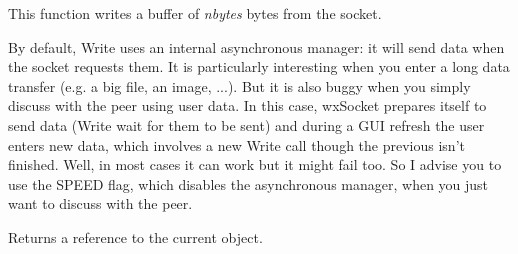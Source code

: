 \label{wxsocketbasesetflags}


\twocolwidtha{7cm}
\begin{twocollist}\itemsep=0pt
\end{twocollist}

%
%
\label{wxsocketbasewrite}


This function writes a buffer of {\it nbytes} bytes from the socket.


By default, Write uses an internal asynchronous manager: it will send data when
the socket requests them. It is particularly interesting when you enter a long
data transfer (e.g. a big file, an image, ...). But it is also buggy when you
simply discuss with the peer using user data. In this case, wxSocket prepares
itself to send data (Write wait for them to be sent) and during a GUI refresh
the user enters new data, which involves a new Write call though the previous
isn't finished. Well, in most cases it can work but it might fail too.  
So I advise you to use the SPEED flag, which disables the asynchronous manager,
when you just want to discuss with the peer.





Returns a reference to the current object.


\\
\\

